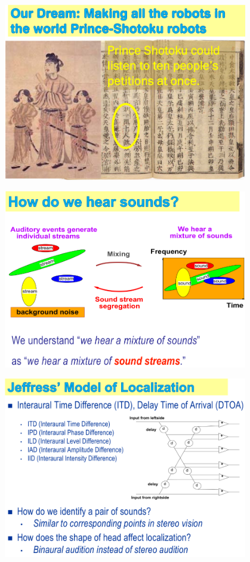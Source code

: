 \documentclass[xetex,mathserif,serif]{beamer}
\begin{document}
	\begin{frame}
		\begin{center}
			\includegraphics[width=0.8\textwidth]{okuno2.png}
		\end{center}
	\end{frame}

	\begin{frame}
		\begin{center}
			\includegraphics[width=0.8\textwidth]{okuno3.png}
		\end{center}
	\end{frame}

	\begin{frame}
		\begin{center}
			\includegraphics[width=0.8\textwidth]{okuno4.png}
		\end{center}
	\end{frame}
\end{document}

